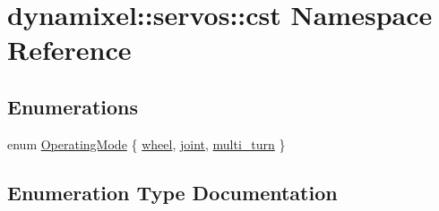 \hypertarget{namespacedynamixel_1_1servos_1_1cst}{}\section{dynamixel\+:\+:servos\+:\+:cst Namespace Reference}
\label{namespacedynamixel_1_1servos_1_1cst}
\subsection*{Enumerations}
\begin{DoxyCompactItemize}
\item 
enum \hyperlink{namespacedynamixel_1_1servos_1_1cst_ac17b5608f65c6495114d34f8efc4d809}{Operating\+Mode} \{ \hyperlink{namespacedynamixel_1_1servos_1_1cst_ac17b5608f65c6495114d34f8efc4d809a01e3275de344ad8e2011c6acda431280}{wheel}, 
\hyperlink{namespacedynamixel_1_1servos_1_1cst_ac17b5608f65c6495114d34f8efc4d809a1fdfcfad31f04d24b25c0842e9d99c48}{joint}, 
\hyperlink{namespacedynamixel_1_1servos_1_1cst_ac17b5608f65c6495114d34f8efc4d809ac4453992c6d6fcd9a66eb6331fd8c945}{multi\+\_\+turn}
 \}
\end{DoxyCompactItemize}


\subsection{Enumeration Type Documentation}
\hypertarget{namespacedynamixel_1_1servos_1_1cst_ac17b5608f65c6495114d34f8efc4d809}{}
